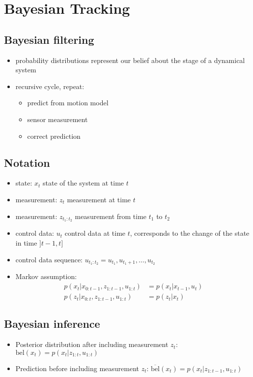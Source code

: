 \documentclass[12pt]{article}
\begin{document}
	\section{Bayesian Tracking}
	\subsection{Bayesian filtering}
	\begin{itemize}
		\item probability distributions represent our belief about the stage of a dynamical system
		\item recursive cycle, repeat:
			\begin{itemize}
				\item predict from motion model
				\item sensor measurement
				\item correct prediction
			\end{itemize}
	\end{itemize}

	\subsection{Notation}
	\begin{itemize}
		\item state: $x_t$ state of the system at time $t$
		\item measurement: $z_t$ measurement at time $t$
		\item measurement: $z_{t_1:t_2}$ measurement from time $t_1$ to $t_2$
		\item control data: $u_t$ control data at time $t$, corresponds to the change of the state in time $]t-1,t]$
		\item control data sequence: $u_{t_1:t_2} = u_{t_1},u_{t_1+1}, \dots, u_{t_2}$
		\item Markov assumption:
			\begin{align}
				p(x_t|x_{0:t-1}, z_{1:t-1},u_{1:t}) &= p(x_t|x_{t-1}, u_t) \\
				p(z_t|x_{0:t}, z_{1:t-1},u_{1:t}) &= p(z_t|x_t)
			\end{align}
	\end{itemize}

	\subsection{Bayesian inference}
	\begin{itemize}
		\item Posterior distribution after including measurement $z_t$: $\text{bel}(x_t) = p(x_t|z_{1:t},u_{1:t})$
		\item Prediction before including measurement $z_t$: $\overline{\text{bel}}(x_t) = p(x_t|z_{1:t-1},u_{1:t})$
	\end{itemize}
	
\end{document}
